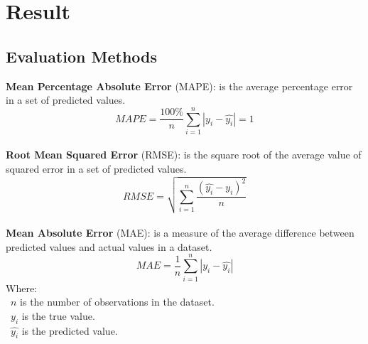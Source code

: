 \documentclass{ieeeojies}
\begin{document}
\section{Result}
\subsection{Evaluation Methods}
\textbf{Mean Percentage Absolute Error} (MAPE): is the average percentage error in a set of predicted values.\\
\[MAPE=\frac{100\%}{n}  \sum_{i=1}^{n} |y_i-\hat{y_i} |  = 1 \]\\
\textbf{Root Mean Squared Error} (RMSE): is the square root of the average value of squared error in a set of predicted values.\\
\[RMSE=\sqrt{\sum_{i=1}^{n} \frac{(\hat{y_i}-y_i )^2}{n} }\]\\
\textbf{Mean Absolute Error} (MAE): is a measure of the average difference between predicted values and actual values in a dataset.\\
\[MAE = \frac{1}{n} \sum_{i=1}^{n} |y_i - \hat{y_i}| \]
Where: \\
	\indent\textbullet\ \(n\) is the number of observations in the dataset.\\
	\indent\textbullet\ \(y_i\)  is the true value.\\
	\indent\textbullet\ \(\hat{y_i}\) is the predicted value.
\end{document}
